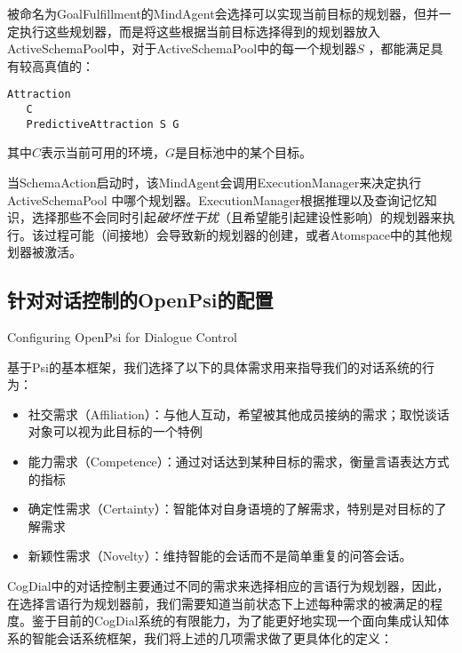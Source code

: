 被命名为GoalFulfillment的MindAgent会选择可以实现当前目标的规划器，但并一定执行这些规划器，而是将这些根据当前目标选择得到的规划器放入ActiveSchemaPool中，对于ActiveSchemaPool中的每一个规划器$S$ ，都能满足具有较高真值的：

\begin{verbatim}
Attraction
   C
   PredictiveAttraction S G
\end{verbatim}

其中$C$表示当前可用的环境，$G$是目标池中的某个目标。

当SchemaAction启动时，该MindAgent会调用ExecutionManager来决定执行ActiveSchemaPool 中哪个规划器。ExecutionManager根据推理以及查询记忆知识，选择那些不会同时引起\textit{破坏性干扰}（且希望能引起建设性影响）的规划器来执行。该过程可能（间接地）会导致新的规划器的创建，或者Atomspace中的其他规划器被激活。

\subsection{针对对话控制的OpenPsi的配置}{Configuring OpenPsi for Dialogue Control}

基于Psi的基本框架，我们选择了以下的具体需求用来指导我们的对话系统的行为：
\begin{itemize}
\item 社交需求（Affiliation）：与他人互动，希望被其他成员接纳的需求；取悦谈话对象可以视为此目标的一个特例
\item 能力需求（Competence）：通过对话达到某种目标的需求，衡量言语表达方式的指标
\item 确定性需求（Certainty）：智能体对自身语境的了解需求，特别是对目标的了解需求
\item 新颖性需求（Novelty）：维持智能的会话而不是简单重复的问答会话。
\end{itemize}

CogDial中的对话控制主要通过不同的需求来选择相应的言语行为规划器，因此，在选择言语行为规划器前，我们需要知道当前状态下上述每种需求的被满足的程度。鉴于目前的CogDial系统的有限能力，为了能更好地实现一个面向集成认知体系的智能会话系统框架，我们将上述的几项需求做了更具体化的定义：

